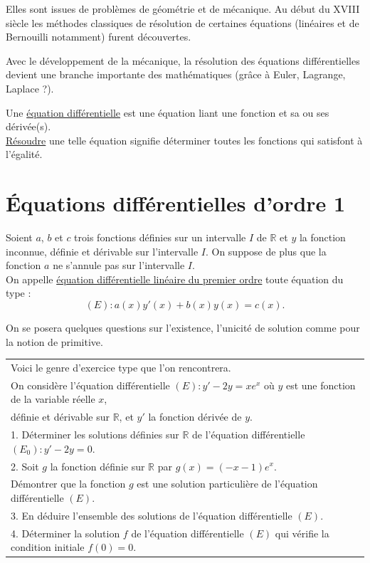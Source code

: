 \documentclass[french]{book}
\newcommand{\R}{\mathbb {R}}
\begin{document}
Elles sont issues de problèmes de géométrie et de
mécanique. Au début du XVIII  siècle les méthodes classiques de résolution de certaines équations
(linéaires et de Bernouilli notamment) furent découvertes.

Avec le développement de la mécanique, la résolution des équations différentielles devient une branche
importante des mathématiques (grâce à Euler, Lagrange, Laplace ?).


Une \underline{équation différentielle} est une équation liant une fonction et sa ou ses dérivée(s).\\
\underline{Résoudre} une telle équation signifie déterminer toutes les fonctions qui satisfont à l'égalité.

\section{Équations différentielles d'ordre 1}

\begin{defn}
Soient $a$, $b$ et $c$ trois fonctions
définies sur un intervalle $I$ de $\R$ et $y$ la fonction inconnue, définie et dérivable sur l'intervalle $I$.
On suppose de plus que la fonction $a$ ne s'annule pas sur l'intervalle $I$. \\
On appelle \underline{équation différentielle linéaire du premier
ordre} toute équation du type :
$$(E):a(x)y'(x)+b(x)y(x) =c(x).$$

\end{defn}

On se posera quelques questions sur l'existence, l'unicité de solution comme pour la notion de primitive.


\begin{tabular}{||l}
Voici le genre d'exercice type que l'on rencontrera. \\

On considère l'équation différentielle $(E):y'-2y=xe^x$ où $y$ est une fonction de la variable réelle $x$, \\
définie et dérivable sur $\R$, et $y'$ la fonction dérivée de $y$. \\
1. Déterminer les solutions définies sur $\R$ de l'équation différentielle $(E_0):y'-2y=0$. \\
2. Soit $g$ la fonction définie sur $\R$ par $g(x)=(-x-1)e^x$. \\
\hspace*{0.3cm} Démontrer que la fonction $g$ est une solution particulière de l'équation différentielle $(E)$. \\
3. En déduire l'ensemble des solutions de l'équation différentielle $(E)$. \\
4. Déterminer la solution $f$ de l'équation différentielle $(E)$ qui vérifie la condition initiale $f(0)=0$. \\
\end{tabular}
\end{document}
